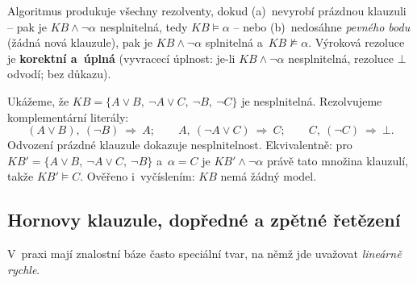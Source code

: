 \noindent Algoritmus produkuje všechny rezolventy, dokud (a)~nevyrobí prázdnou klauzuli -- pak je $KB\wedge\neg\alpha$ nesplnitelná, tedy $KB\models\alpha$ -- nebo (b)~nedosáhne \emph{pevného bodu} (žádná nová klauzule), pak je $KB\wedge\neg\alpha$ splnitelná a~$KB\not\models\alpha$. Výroková rezoluce je \textbf{korektní a~úplná} (vyvracecí úplnost: je-li $KB\wedge\neg\alpha$ nesplnitelná, rezoluce $\bot$ odvodí; bez důkazu).

\begin{priklad}
Ukážeme, že $KB=\{A\vee B,\ \neg A\vee C,\ \neg B,\ \neg C\}$ je nesplnitelná. Rezolvujeme komplementární literály:
\[
(A\vee B),\ (\neg B)\ \Rightarrow\ A;\qquad A,\ (\neg A\vee C)\ \Rightarrow\ C;\qquad C,\ (\neg C)\ \Rightarrow\ \bot.
\]
Odvození prázdné klauzule dokazuje nesplnitelnost. Ekvivalentně: pro $KB'=\{A\vee B,\ \neg A\vee C,\ \neg B\}$ a~$\alpha=C$ je $KB'\wedge\neg\alpha$ právě tato množina klauzulí, takže $KB'\models C$. Ověřeno i~vyčíslením: $KB$ nemá žádný model.
\end{priklad}

\begin{center}
\end{center}

\subsection{Hornovy klauzule, dopředné a zpětné řetězení}

V~praxi mají znalostní báze často speciální tvar, na němž jde uvažovat \emph{lineárně rychle}.

